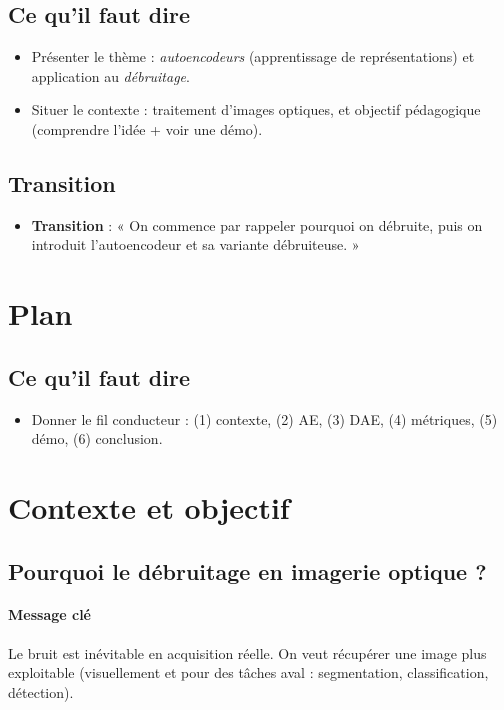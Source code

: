 \documentclass[11pt,a4paper]{article}
\begin{document}
\subsection*{Ce qu'il faut dire}
\begin{itemize}
  \item Présenter le thème : \emph{autoencodeurs} (apprentissage de représentations) et application au \emph{débruitage}.
  \item Situer le contexte : traitement d'images optiques, et objectif pédagogique (comprendre l'idée + voir une démo).
\end{itemize}

\subsection*{Transition}
\begin{itemize}
  \item \textbf{Transition} : « On commence par rappeler pourquoi on débruite, puis on introduit l'autoencodeur et sa variante débruiteuse. »
\end{itemize}

\section{Plan}
\subsection*{Ce qu'il faut dire}
\begin{itemize}
  \item Donner le fil conducteur : (1) contexte, (2) AE, (3) DAE, (4) métriques, (5) démo, (6) conclusion.
\end{itemize}

\section{Contexte et objectif}

\subsection{Pourquoi le débruitage en imagerie optique ?}
\paragraph{Message clé}
Le bruit est inévitable en acquisition réelle. On veut récupérer une image plus exploitable (visuellement et pour des tâches aval : segmentation, classification, détection).
\end{document}
